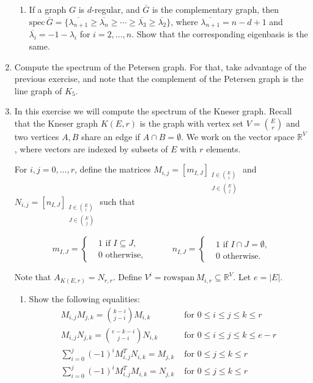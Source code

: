 \documentclass[kulak]{tplt}
\theoremstyle{definition}
\newcommand{\R}{\mathbb{R}}
\newcommand{\rowspn}{\mathrm{rowspan}}
\newcommand{\spec}{\mathrm{spec}}
\begin{document}
\begin{enumerate}
\begin{enumerate}
\item If a graph $G$ is $d$-regular, and $\overline{G}$ is the complementary graph, then $\spec \, \overline{G} = \{ \overline{\lambda_{n+1}} \geq  \overline{\lambda_{n}} \geq  \cdots \geq  \overline{\lambda_{3}} \geq  \overline{\lambda_{2}} \}$, where $\overline{\lambda_{n+1}} = n - d + 1$ and $\overline{\lambda_i} = - 1 - \lambda _ i$ for $i = 2, \ldots, n$.
Show that the corresponding eigenbasis is the same.
\end{enumerate}


\item Compute the spectrum of the Petersen graph.
For that, take advantage of the previous exercise, and note that the complement of the Petersen graph is the line graph of $K_5$.

\item In this exercise we will compute the spectrum of the Kneser graph.
Recall that the Kneser graph $K(E, r)$ is the graph with vertex set $V = \binom{E}{r}$ and two vertices $A, B$ share an edge if $A \cap B = \emptyset$.
We work on the vector space $\R^V$, where vectors are indexed by subsets of $E$ with $r$ elements.

For $i, j = 0, \ldots, r$, define the matrices $M_{i, j} = [m_{I, J}]_{\substack{I\in \binom{E}{i} \\ J \in \binom{E}{j}}}$ and $N_{i, j} = [n_{I, J}]_{\substack{I\in \binom{E}{i} \\ J \in \binom{E}{j}}}$ such that 

$$ m_{I, J} =\begin{cases*}
      & 1 \text{ if $I \subseteq J$,}\\
      & 0 \text{ otherwise,}
    \end{cases*}  \quad \quad \quad 
     n_{I, J} =\begin{cases*}
      & 1 \text{ if $I \cap J = \emptyset $,}\\
      & 0 \text{ otherwise.}
    \end{cases*}  $$

Note that $A_{K(E, r)} = N_{r, r}$.
Define $V^i = \rowspn \, M_{i, r} \subseteq \R^V$.
Let $e = |E|$.

\begin{enumerate}
\item
Show the following equalities:
\begin{equation}\label{eq:matrices}
\begin{split}
M_{i, j} M_{j, k} = \binom{k-i}{j-i} M_{i, k} &\text{ for $0\leq i \leq j \leq k \leq r$}\\
M_{i, j} N_{j, k} = \binom{e-k-i}{j-i} N_{i, k}  &\text{ for $0\leq i \leq j \leq k \leq e - r$}\\
\sum_{i=0}^j (-1)^i M_{i, j}^T N_{i, k} = M_{j, k} &\text{ for $0\leq j \leq k \leq r$}\\
\sum_{i=0}^j (-1)^i M_{i, j}^T M_{i, k} = N_{j, k} &\text{ for $0\leq j \leq k \leq r$}\\
\end{split}
\end{equation}


\end{enumerate}
\end{enumerate}
\end{document}
